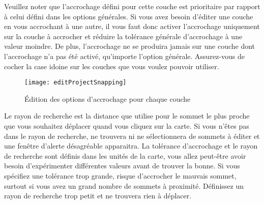 Veuillez noter que l'accrochage défini pour cette couche est prioritaire par rapport à celui défini dans les options générales. Si vous avez besoin d'éditer une couche en vous accrochant à une autre, il vous faut donc activer l'accrochage uniquement sur la couche à accrocher et réduire la tolérance générale d'accrochage à une valeur moindre. De plus, l'accrochage ne se produira jamais sur une couche dont l'accrochage n'a pas été activé, qu'importe l'option générale. Assurez-vous de cocher la case idoine sur les couches que vous voulez pouvoir utiliser.

\begin{figure}[H]
  \begin{center}
  \texttt{[image: editProjectSnapping]}
  \caption{Édition des options d'accrochage pour chaque couche \nixcaption}\label{fig:snappingoptions}
\end{center}
\end{figure}


Le rayon de recherche est la distance que \qg utilise pour  le sommet le plus proche que vous souhaitez déplacer quand vous cliquez sur la carte. Si vous n'êtes pas dans le rayon de recherche, \qg ne trouvera ni ne sélectionnera de sommets à éditer et une fenêtre d'alerte désagréable apparaitra. La tolérance d'accrochage et le rayon de recherche sont définis dans les unités de la carte, vous allez peut-être avoir besoin d'expérimenter différentes valeurs avant de trouver la bonne. Si vous spécifiez une tolérance trop grande, \qg risque d'accrocher le mauvais sommet, surtout si vous avez un grand nombre de sommets à proximité. Définissez un rayon de recherche trop petit et \qg ne trouvera rien à déplacer.

